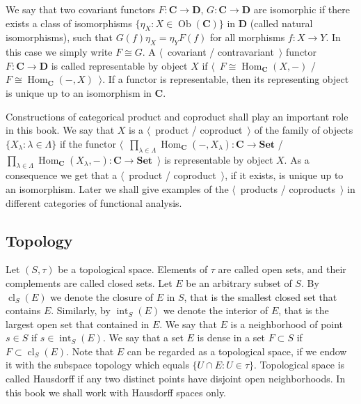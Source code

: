 We say that two covariant functors $F:\mathbf{C}\to\mathbf{D}$,
$G:\mathbf{C}\to\mathbf{D}$ are isomorphic if there exists a class of
isomorphisms $ \{\eta_X:X\in\operatorname{Ob}(\mathbf{C}) \}$ in $\mathbf{D}$
(called natural isomorphisms), such that $G(f)\eta_X=\eta_Y F(f)$ for all morphisms
$f:X\to Y$. In this case we simply write $F\cong G$. A $\langle$~covariant /
contravariant~$\rangle$ functor $F:\mathbf{C}\to\mathbf{D}$ is called
representable by object $X$ if
$\langle$~$F\cong\operatorname{Hom}_{\mathbf{C}}(X,-)$ /
$F\cong\operatorname{Hom}_{\mathbf{C}}(-,X)$~$\rangle$. If a functor is
representable, then its representing object is unique up to an isomorphism in
$\mathbf{C}$.

Constructions of categorical product and coproduct shall play an important role
in this book. We say that $X$ is a $\langle$~product / coproduct~$\rangle$
of the family of objects $ \{X_\lambda:\lambda\in\Lambda \}$ if the functor
$\langle$~$
\prod_{\lambda\in\Lambda}\operatorname{Hom}_{\mathbf{C}}(-,X_{\lambda})
:\mathbf{C}\to\mathbf{Set}$
/
$
\prod_{\lambda\in\Lambda}\operatorname{Hom}_{\mathbf{C}}(X_{\lambda},-)
:\mathbf{C}\to\mathbf{Set}$~$\rangle$
is representable by object $X$. As a consequence we get that a
$\langle$~product / coproduct~$\rangle$, if it exists, is unique up to an
isomorphism. Later we shall give examples of the $\langle$~products /
coproducts~$\rangle$ in different categories of functional analysis. 



\subsection{
  Topology}\label{SubSectionTopology}

Let $(S,\tau)$ be a topological space. Elements of $\tau$ are called open sets,
and their complements are called closed sets. Let $E$ be an arbitrary subset of
$S$. By $\operatorname{cl}_S(E)$ we denote the closure of $E$ in $S$, that is
the smallest closed set that contains $E$. Similarly, by
$\operatorname{int}_S(E)$ we denote the interior of $E$, that is the largest
open set that contained in $E$. We say that $E$ is a neighborhood of point 
$s\in S$ if $s\in \operatorname{int}_S(E)$. We say that a set $E$ is dense 
in a set $F\subset S$ if $F\subset\operatorname{cl}_S(E)$. Note that $E$ can 
be regarded as a topological space, if we endow it with the subspace topology 
which equals $\{U\cap E:U\in\tau \}$. Topological space is called Hausdorff if any two
distinct points have disjoint open neighborhoods. In this book we shall work
with Hausdorff spaces only.

